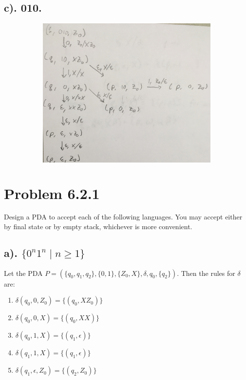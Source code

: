 \documentclass[20pt]{article} %
\begin{document}
\subsection{c). 010.}
\begin{figure}[!htbp]
  	\centering
   	\begin{subfigure}[p]{0.6\linewidth}
    	\includegraphics[width=\linewidth]{./figures/h7-3.jpg}
   	\end{subfigure}
\end{figure} 
\section{Problem 6.2.1}
Design a PDA to accept each of the following languages.  You may accept either by final state or by empty stack, whichever is more convenient.  
\subsection{a). $\{0^{n}1^{n} \mid n \geq 1\}$}
Let the PDA $\!P = (\{q_0, q_1, q_2\}, \{0,1\}, \{Z_0, X\}, \delta, q_0, \{q_2\})$. Then the rules for $\delta$ are: \\
\begin{enumerate}
\item $\delta(q_0, 0, Z_0) = \{(q_0, XZ_0)\}$
\item $\delta(q_0, 0, X) = \{(q_0, XX)\}$
\item $\delta(q_0, 1, X) = \{(q_1, \epsilon)\}$
\item $\delta(q_1, 1, X) = \{(q_1, \epsilon)\}$
\item $\delta(q_1, \epsilon, Z_0) = \{(q_2, Z_0)\}$
\end{enumerate}
\end{document}
